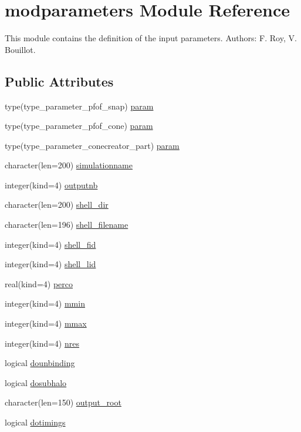 \hypertarget{classmodparameters}{\section{modparameters Module Reference}
\label{classmodparameters}
}


This module contains the definition of the input parameters. Authors\-: F. Roy, V. Bouillot.  


\subsection*{Public Attributes}
\begin{DoxyCompactItemize}
\item 
type(type\-\_\-parameter\-\_\-pfof\-\_\-snap) \hyperlink{classmodparameters_a5bc8037f0b9d0512a3270e202301c149}{param}
\item 
type(type\-\_\-parameter\-\_\-pfof\-\_\-cone) \hyperlink{classmodparameters_a32546175bce08b1ac34285f2ccbcab42}{param}
\item 
type(type\-\_\-parameter\-\_\-conecreator\-\_\-part) \hyperlink{classmodparameters_abc02ba22055134e4f7e714d0cc521f61}{param}
\item 
character(len=200) \hyperlink{classmodparameters_a8e3087ed26ddd977f3b7214948ebf62b}{simulationname}
\item 
integer(kind=4) \hyperlink{classmodparameters_af9c51fea2e80f26e50d7543bbe12add7}{outputnb}
\item 
character(len=200) \hyperlink{classmodparameters_adb57a3540b1d0caa308f50ac8f56d99f}{shell\-\_\-dir}
\item 
character(len=196) \hyperlink{classmodparameters_a6dab5a077dd6af2175b0d59dd11f171a}{shell\-\_\-filename}
\item 
integer(kind=4) \hyperlink{classmodparameters_ab8116a893043284dd7f4c7d54d179af6}{shell\-\_\-fid}
\item 
integer(kind=4) \hyperlink{classmodparameters_a669111d8b0ac2247e89f14c8778d77d5}{shell\-\_\-lid}
\item 
real(kind=4) \hyperlink{classmodparameters_a555c497cb7980e89a34876df62f2b22b}{perco}
\item 
integer(kind=4) \hyperlink{classmodparameters_a4f5bb13705cae2bfb6255cf7b498aacc}{mmin}
\item 
integer(kind=4) \hyperlink{classmodparameters_a1dc1488fae7094ded9408953a21ada2f}{mmax}
\item 
integer(kind=4) \hyperlink{classmodparameters_af1cb485d0a4ab3c8e0c54b81973aff9a}{nres}
\item 
logical \hyperlink{classmodparameters_a80bb718489050f3b3c056aae1774984d}{dounbinding}
\item 
logical \hyperlink{classmodparameters_ae2628157b1f65431117f867006409948}{dosubhalo}
\item 
character(len=150) \hyperlink{classmodparameters_a95d5a1eac507fc27906f93bd48c77d10}{output\-\_\-root}
\item 
logical \hyperlink{classmodparameters_a3d21125b69403e3097f85434aa2bb08d}{dotimings}
\end{DoxyCompactItemize}


